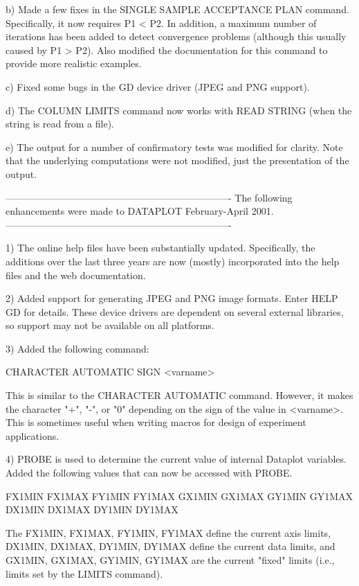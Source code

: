 {     b) Made a few fixes in the SINGLE SAMPLE ACCEPTANCE PLAN
        command.  Specifically, it now requires P1 < P2.  In addition,
        a maximum number of iterations has been added to detect
        convergence problems (although this usually caused by P1 > P2).
        Also modified the documentation for this command to provide
        more realistic examples.

     c) Fixed some bugs in the GD device driver (JPEG and PNG
        support).

     d) The COLUMN LIMITS command now works with READ STRING
        (when the string is read from a file).

     e) The output for a number of confirmatory tests was modified
        for clarity.  Note that the underlying computations were
        not modified, just the presentation of the output.

----------------------------------------------------------------------
The following enhancements were made to DATAPLOT February-April  2001.
----------------------------------------------------------------------

 1) The online help files have been substantially updated.
    Specifically, the additions over the last three years are
    now (mostly) incorporated into the help files and the
    web documentation.

 2) Added support for generating JPEG and PNG image formats.
    Enter HELP GD for details.  These device drivers are dependent
    on several external libraries, so support may not be
    available on all platforms.

 3) Added the following command:

      CHARACTER AUTOMATIC SIGN <varname>

    This is similar to the CHARACTER AUTOMATIC command.  However,
    it makes the character "+", "-", or "0" depending on the
    sign of the value in <varname>.  This is sometimes useful
    when writing macros for design of experiment applications.

 4) PROBE is used to determine the current value of internal
    Dataplot variables.  Added the following values that can
    now be accessed with PROBE.

       FX1MIN
       FX1MAX
       FY1MIN
       FY1MAX
       GX1MIN
       GX1MAX
       GY1MIN
       GY1MAX
       DX1MIN
       DX1MAX
       DY1MIN
       DY1MAX

    The FX1MIN, FX1MAX, FY1MIN, FY1MAX define the current
    axis limits, DX1MIN, DX1MAX, DY1MIN, DY1MAX define the
    current data limits, and GX1MIN, GX1MAX, GY1MIN, GY1MAX
    are the current "fixed" limits (i.e., limits set by the
    LIMITS command).

}
